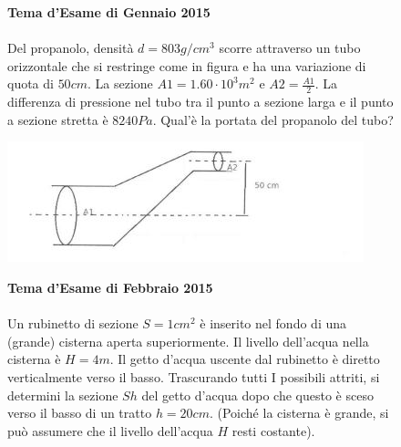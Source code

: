 \begin{figure}[h!]
\textbf{Tema d'Esame di Gennaio 2015}\\ \\
Del propanolo, densità $d=803 g/cm^3$ scorre attraverso un tubo orizzontale che si restringe come in figura e ha una variazione di quota di $50cm$. La sezione $A1=1.60\cdot 10^3m^2$ e $A2=\frac{A1}{2}$. La differenza di pressione nel tubo tra il punto a sezione larga e il punto a sezione stretta è $8240Pa$. Qual'è la portata del propanolo del tubo?
\\
	\begin{center}
		\includegraphics[scale=1.1]{ES4/GEN042015.jpg}
	\end{center}
\end{figure}

\begin{figure}[h!]
\textbf{Tema d'Esame di Febbraio 2015}\\ \\
 Un rubinetto di sezione $S = 1 cm^2$
 è inserito nel fondo di una (grande) cisterna aperta
superiormente. Il livello dell'acqua nella cisterna è $H = 4 m$. Il getto d'acqua uscente dal
rubinetto è diretto verticalmente verso il basso. Trascurando tutti I possibili attriti, si
determini la sezione $Sh$ del getto d'acqua dopo che questo è sceso verso il basso di un tratto
$h = 20 cm$. (Poiché la cisterna è grande, si può assumere che il livello dell'acqua $H$ resti
costante).
\\
\end{figure}

